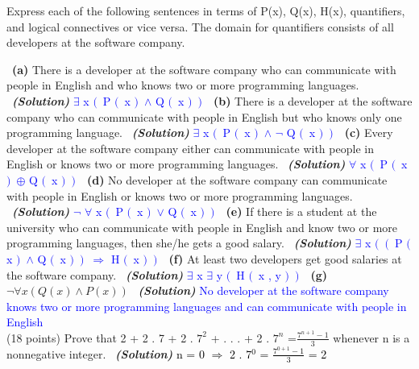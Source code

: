 \documentclass[a4 paper]{article}
\numberwithin{equation}{section}
\newcommand{\problem}[2]{~\\\fbox{\textbf{Problem #1}}\hfill (#2 points)\newline\newline}
\newcommand{\subproblem}[1]{~\newline\textbf{(#1)}}
\newcommand{\solution}{~\newline\textbf{\textit{(Solution)}} }
\newcommand{\0}{\mathbf{0}}
\begin{document}
Express each of the following sentences in terms of P(x), Q(x), H(x), quantifiers, and logical connectives or vice versa. The domain
for quantifiers consists of all developers at the software company.

\subproblem{a} There is a developer at the software company who can communicate with people in English and who knows two or more programming languages.
\solution
\textcolor{blue}{$\exists$ x $( \,$ P $( \,$ x $) \,$ $\land$ Q $( \,$ x $) \,$ $) \,$}
\newline
\subproblem{b} There is a developer at the software company who can communicate with people in English but who knows only one programming language.
\solution
\textcolor{blue}{$\exists$ x $( \,$ P $( \,$ x $) \,$ $\land$ $\neg$ Q $( \,$ x $) \,$ $) \,$}
\newline
\subproblem{c} Every developer at the software company either can communicate with people in English or knows two or more programming languages.
\solution
\textcolor{blue}{$\forall$ x $( \,$ P $( \,$ x $) \,$ $\oplus$ Q $( \,$ x $) \,$ $) \,$}
\newline
\subproblem{d} No developer at the software company can communicate with people in English or knows two or more programming languages.
\solution
\textcolor{blue}{$\neg$ $\forall$ x $( \,$ P $( \,$ x $) \,$ $\lor$ Q $( \,$ x $) \,$ $) \,$}
\newline
\subproblem{e} If there is a student at the university who can communicate with people in English and know two or more programming languages, then she/he gets a good salary.
\solution
\textcolor{blue}{$\exists$ x $( \,$ $( \,$ P $( \,$ x $) \,$ $\land$ Q $( \,$ x $) \,$ $) \,$ $\Rightarrow$ H $( \,$ x $) \,$ $) \,$}
\newline
\subproblem{f} At least two developers get good salaries at the software company.
\solution
\textcolor{blue}{$\exists$ x $\exists$ y $( \,$ H $( \,$ x , y $) \,$ $) \,$}
\newline
\subproblem{g} $\neg \forall x (Q(x) \wedge P(x))$
\solution
\textcolor{blue}{No developer at the software company knows two or more programming languages and can communicate with people in English}
\newpage
\problem{4: Mathematical Induction}{18}
Prove that 2 + 2 . 7 + 2 . $7^2$ + . . . + 2 . $7^n$ =$\frac{7^{n+1} - 1}{3}$
whenever n is a nonnegative integer.
\solution
\newline
\newline
\textcolor{black}{n = 0 $\Rightarrow$ 2 . 7$^0$ = $\frac{7^{0+1} - 1}{3}$ = 2}
\end{document}
